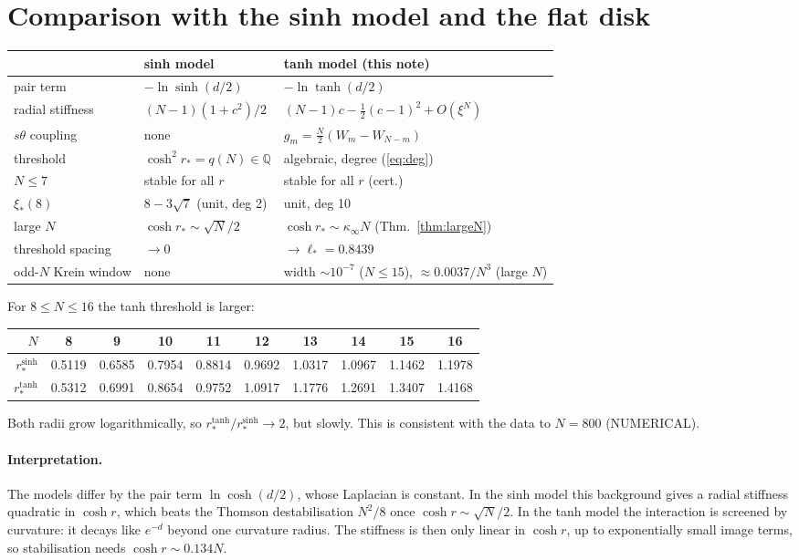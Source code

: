 \documentclass[11pt]{article}
\theoremstyle{remark}
\begin{document}
\section{Comparison with the sinh model and the flat disk}\label{sec:compare}
\begin{center}
\begin{tabular}{lll}\toprule
& sinh model~\cite{MT} & tanh model (this note)\\\midrule
pair term & $-\ln\sinh(d/2)$ & $-\ln\tanh(d/2)$\\
radial stiffness & $(N-1)(1+c^2)/2$ & $(N-1)c-\frac12(c-1)^2+O(\xi^N)$\\
$s\theta$ coupling & none & $g_m=\frac N2(W_m-W_{N-m})$\\
threshold & $\cosh^2r_*=q(N)\in\mathbb Q$ & algebraic, degree (\ref{eq:deg})\\
$N\le7$ & stable for all $r$ & stable for all $r$ (cert.)\\
$\xi_*(8)$ & $8-3\sqrt7$ (unit, deg 2) & unit, deg 10\\
large $N$ & $\cosh r_*\sim\sqrt N/2$ & $\cosh r_*\sim\kappa_\infty N$ (Thm.~\ref{thm:largeN})\\
threshold spacing & $\to0$ & $\to\ell_*=0.8439$\\
odd-$N$ Krein window & none & width $\sim10^{-7}$ ($N\le15$), $\approx0.0037/N^3$ (large $N$)\\\bottomrule
\end{tabular}
\end{center}
For $8\le N\le16$ the tanh threshold is larger:
\begin{center}
\begin{tabular}{rccccccccc}\toprule
$N$ & 8&9&10&11&12&13&14&15&16\\\midrule
$r_*^{\sinh}$ & 0.5119&0.6585&0.7954&0.8814&0.9692&1.0317&1.0967&1.1462&1.1978\\
$r_*^{\tanh}$ & 0.5312&0.6991&0.8654&0.9752&1.0917&1.1776&1.2691&1.3407&1.4168\\\bottomrule
\end{tabular}
\end{center}
Both radii grow logarithmically, so $r_*^{\tanh}/r_*^{\sinh}\to2$, but slowly. This is consistent with the data to
$N=800$ (NUMERICAL).

\paragraph{Interpretation.} The models differ by the pair term $\ln\cosh(d/2)$, whose Laplacian is constant. In the sinh
model this background gives a radial stiffness quadratic in $\cosh r$, which beats the Thomson destabilisation $N^2/8$
once $\cosh r\sim\sqrt N/2$. In the tanh model the interaction is screened by curvature: it decays like $e^{-d}$ beyond
one curvature radius. The stiffness is then only linear in $\cosh r$, up to exponentially small image terms, so stabilisation needs
$\cosh r\sim0.134N$.
\end{document}
